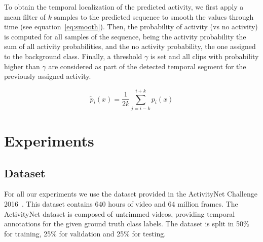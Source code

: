 \documentclass{article}
\begin{document}

To obtain the temporal localization of the predicted activity, we first apply a mean filter of $k$ samples to the predicted sequence to smooth the values through time (see equation~\ref{eq:smooth}). Then, the probability of activity (vs no activity) is computed for all samples of the sequence, being the activity probability the sum of all activity probabilities, and the no activity probability, the one assigned to the background class. Finally, a threshold $\gamma$ is set and all clips with probability higher than $\gamma$ are considered as part of the detected temporal segment for the previously assigned activity.

\begin{equation}
	\tilde{p}_i(x) = \frac{1}{2k} \sum_{j=i-k}^{i+k} p_i(x)
    \label{eq:smooth}
\end{equation}



\section{Experiments}

\subsection{Dataset}
For all our experiments we use the dataset provided in the ActivityNet Challenge 2016~\cite{caba2015activitynet}. This dataset contains 640 hours of video and 64 million frames. The ActivityNet dataset is composed of untrimmed videos, providing temporal annotations for the given ground truth class labels. The dataset is split in 50\% for training, 25\% for validation and 25\% for testing.
\end{document}
